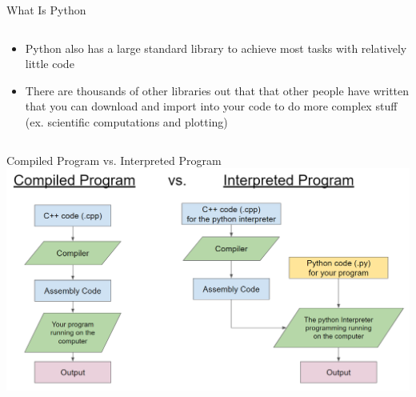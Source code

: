 \documentclass[aspectratio=169]{beamer}
\begin{document}
\begin{frame}{What Is Python}
\begin{columns}
\begin{column}{0.7\textwidth}
\begin{itemize}
                \item Python also has a large standard library to achieve most tasks with relatively little code
                \item There are thousands of other libraries out that that other people have written that you can download and import into your code to do more complex stuff (ex. scientific computations and plotting)
            \end{itemize}
        \end{column}
    \end{columns}
\end{frame}

\begin{frame}{Compiled Program vs. Interpreted Program}
    \centering
    \includegraphics[width=\textwidth]{imgs/compiled_v_interpreted.png}
\end{frame}
\end{document}
